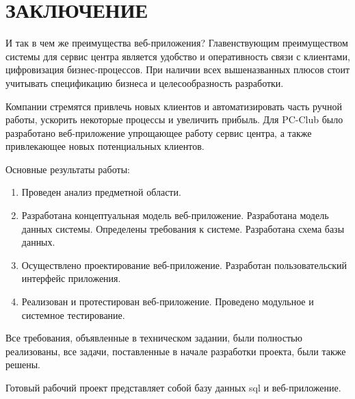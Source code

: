 \section*{ЗАКЛЮЧЕНИЕ}

И так в чем же преимущества веб-приложения? Главенствующим преимуществом системы для сервис центра является удобство и оперативность связи с клиентами, цифровизация бизнес-процессов. При наличии всех вышеназванных плюсов стоит учитывать спецификацию бизнеса и целесообразность разработки.
  
Компании стремятся привлечь новых клиентов и автоматизировать часть ручной работы, ускорить некоторые процессы и увеличить прибыль. Для PC-Club было разработано веб-приложение упрощающее работу сервис центра, а также привлекающее новых потенциальных клиентов.

Основные результаты работы:

\begin{enumerate}
\item Проведен анализ предметной области.
\item Разработана концептуальная модель веб-приложение. Разработана модель данных системы. Определены требования к системе. Разработана схема базы данных.
\item Осуществлено проектирование веб-приложение. Разработан пользовательский интерфейс приложения.
\item Реализован и протестирован веб-приложение. Проведено модульное и системное тестирование.
\end{enumerate}

Все требования, объявленные в техническом задании, были полностью реализованы, все задачи, поставленные в начале разработки проекта, были также решены.

Готовый рабочий проект представляет собой базу данных sql и веб-приложение.